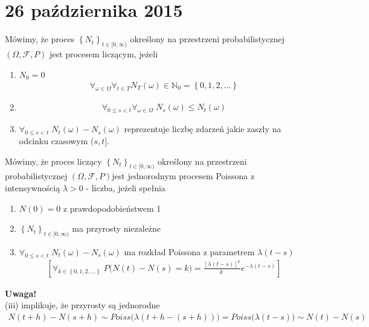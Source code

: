 \chapter{26 października 2015}
\begin{defi}
Mówimy, że proces $ \left\{N_t\right\}_{t\in[0,\infty )} $ określony na przestrzeni probabilistycznej $(\Omega,\mathcal F,P)$ jest procesem liczącym, jeżeli
\begin{enumerate}
\item $ N_0=0 $
\begin{gather*}
\forall_{\omega\in\Omega}\forall_{t\in T}N_T(\omega)\in \mathbb N _0=\left\{0,1,2,\dots \right\}
\end{gather*}
\item 
\begin{gather*}
\forall_{0\le s<t}\forall_{\omega\in\Omega}\;
N_s(\omega)\le N_t(\omega)
\end{gather*}
\item $ \forall_{0\le s<t}\; N_t(\omega)-N_s(\omega) $ reprezentuje liczbę zdarzeń jakie zaszły na odcinku czasowym $ (s,t] $.
\end{enumerate}
\end{defi}
\begin{defi}
Mówimy, że proces liczący $ \left\{N_t\right\}_{t\in[0,\infty )} $ określony na   przestrzeni probabilistycznej $(\Omega,\mathcal F,P)$jest jednorodnym procesem Poissona z intensywnością $ \lambda>0 $ - liczba, jeżeli spełnia
\begin{enumerate}[i]
\item $ N(0)=0 $ z prawdopodobieństwem 1
\item $ \left\{N_t\right\}_{t\in[0,\infty )} $ ma przyrosty niezależne
\item $ \forall_{0\le s<t}\; N_t(\omega)-N_s(\omega) $ ma rozkład Poissona z parametrem $ \lambda(t-s) $
\begin{gather*}
\left[\forall_{k\in\left\{0,1,2,\dots\right\}}\;
P\bigl(N(t)-N(s)=k\bigr)=\frac{\left[\lambda(t-s)\right]^k}{k~}e^{-\lambda(t-s)}
\right]
\end{gather*}
\end{enumerate}
\end{defi}

\textbf{Uwaga!}\\
(iii) implikuje, że przyrosty są jednorodne
\begin{gather*}
N(t+h)-N(s+h)\sim
Poiss\bigl(\lambda(t+h-(s+h))\bigr)=
Poiss\bigl(\lambda(t-s)\bigr)\sim
N(t)-N(s)
\end{gather*}

